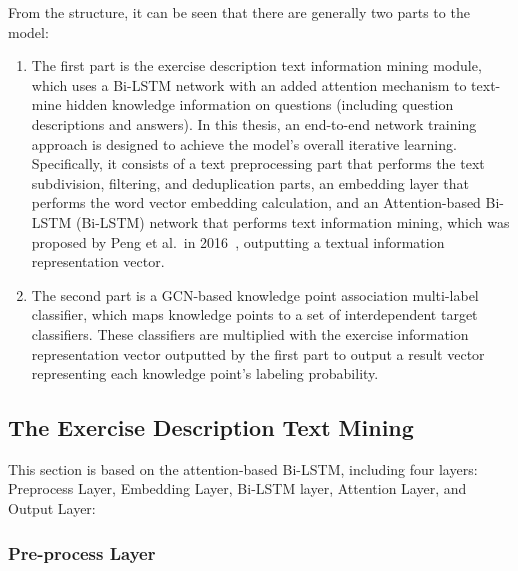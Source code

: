 From the structure, it can be seen that there are generally two parts to the model:
\begin{enumerate}
    \item The first part is the exercise description text information mining module, which uses a Bi-LSTM network with an added attention mechanism to text-mine hidden knowledge information on questions (including question descriptions and answers). In this thesis, an end-to-end network training approach is designed to achieve the model's overall iterative learning. Specifically, it consists of a text preprocessing part that performs the text subdivision, filtering, and deduplication parts, an embedding layer that performs the word vector embedding calculation, and an Attention-based Bi-LSTM (Bi-LSTM) network that performs text information mining, which was proposed by Peng et al.\ in 2016~\cite{zhou2016attention}, outputting a textual information representation vector.
    \item The second part is a GCN-based knowledge point association multi-label classifier, which maps knowledge points to a set of interdependent target classifiers. These classifiers are multiplied with the exercise information representation vector outputted by the first part to output a result vector representing each knowledge point's labeling probability.
\end{enumerate}


\subsection{The Exercise Description Text Mining}
This section is based on the attention-based Bi-LSTM, including four layers: Preprocess Layer, Embedding Layer, Bi-LSTM layer, Attention Layer, and Output Layer:
\subsubsection{Pre-process Layer}



